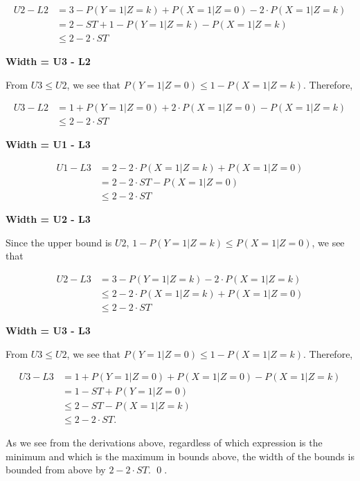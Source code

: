 \documentclass[
]{article}
\theoremstyle{plain}
\begin{document}
\[\begin{aligned}
U2 - L2 &= 3 - P(Y = 1 | Z = k) + P(X = 1 | Z = 0) - 2\cdot P(X = 1 | Z = k) \\
        &= 2 - ST + 1 - P(Y = 1 | Z = k) - P(X = 1 | Z = k) \\
        &\le 2 - 2\cdot ST
\end{aligned}\]

\textbf{Width = U3 - L2}

From \(U3 \le U2\), we see that \(P(Y = 1 | Z = 0) \le 1 - P(X = 1 | Z = k)\). Therefore,

\[\begin{aligned}
U3 - L2 &= 1 + P(Y = 1 | Z = 0) + 2\cdot P(X = 1 | Z = 0) - P(X = 1 | Z = k) \\
        &\le 2 - 2\cdot ST
\end{aligned}\]

\textbf{Width = U1 - L3}

\[\begin{aligned}
U1 - L3 &= 2 - 2\cdot P(X = 1 | Z = k) + P(X = 1 | Z = 0) \\
        &= 2 - 2\cdot ST - P(X = 1 | Z = 0) \\
        &\le 2 - 2\cdot ST
\end{aligned}\]

\textbf{Width = U2 - L3}

Since the upper bound is \(U2\), \(1 - P(Y = 1 | Z = k) \le P(X = 1 | Z = 0)\), we see that

\[\begin{aligned}
U2 - L3 &= 3 - P(Y = 1 | Z = k) - 2\cdot P(X = 1 | Z = k) \\
        &\le 2 - 2\cdot P(X = 1 | Z = k) + P(X = 1 | Z = 0) \\
        &\le 2 - 2\cdot ST
\end{aligned}\]

\textbf{Width = U3 - L3}

From \(U3 \le U2\), we see that \(P(Y = 1 | Z = 0) \le 1 - P(X = 1 | Z = k)\). Therefore,

\[\begin{aligned}
U3 - L3 &= 1 + P(Y = 1 | Z = 0) + P(X = 1 | Z = 0) - P(X = 1 | Z = k)\\
        &= 1 - ST + P(Y = 1 | Z = 0) \\
        &\le 2 - ST - P(X = 1 | Z = k) \\
        &\le 2 - 2\cdot ST.
\end{aligned}\]

As we see from the derivations above, regardless of which expression is the minimum and which is the maximum in bounds above, the width of the bounds is bounded from above by \(2 - 2\cdot ST\). \qed.
\end{document}
